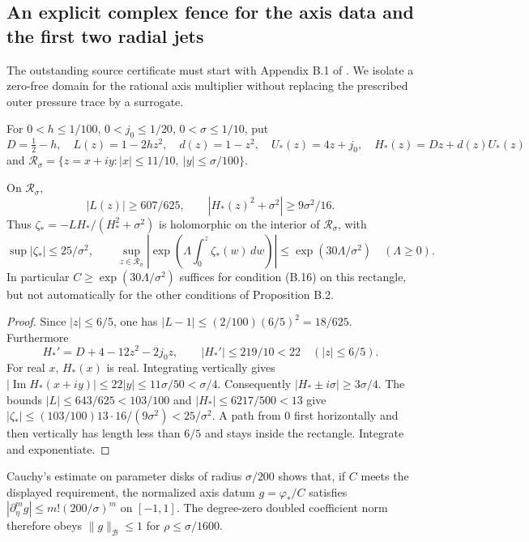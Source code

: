 \subsection*{An explicit complex fence for the axis data and the first two radial jets}
\label{subsec:axis-fence-jets}
The outstanding source certificate must start with Appendix B.1 of \cite{openai2026}. We isolate a zero-free domain for the rational axis multiplier without replacing the prescribed outer pressure trace by a surrogate.

For $0<h\le1/100$, $0<j_0\le1/20$, $0<\sigma\le1/10$, put
\[
 D=\tfrac12-h,\quad L(z)=1-2hz^2,\quad d(z)=1-z^2,\quad
 U_*(z)=4z+j_0,\quad H_*(z)=Dz+d(z)U_*(z)
\]
and $\mathcal R_\sigma=\{z=x+iy:|x|\le11/10,\ |y|\le\sigma/100\}$.

\begin{proposition}
\label{prop:axis-data-zero-free}
On $\mathcal R_\sigma$,
\[
 |L(z)|\ge607/625,\qquad |H_*(z)^2+\sigma^2|\ge9\sigma^2/16.
\]
Thus $\zeta_*=-LH_*/(H_*^2+\sigma^2)$ is holomorphic on the interior of $\mathcal R_\sigma$, with
\[
 \sup|\zeta_*|\le25/\sigma^2,\qquad
 \sup_{z\in\mathcal R_\sigma}\left|\exp\left(\Lambda\int_0^z\zeta_*(w)\,dw\right)\right|
 \le\exp(30\Lambda/\sigma^2)
 \quad(\Lambda\ge0).
\]
In particular $C\ge\exp(30\Lambda/\sigma^2)$ suffices for condition (B.16) on this rectangle, but not automatically for the other conditions of Proposition B.2.
\end{proposition}
\begin{proof}
Since $|z|\le6/5$, one has
$|L-1|\le(2/100)(6/5)^2=18/625$. Furthermore
\[
 H_*'=D+4-12z^2-2j_0z,\qquad
 |H_*'|\le219/10<22\quad (|z|\le6/5).
\]
For real $x$, $H_*(x)$ is real. Integrating vertically gives
$|\operatorname{Im}H_*(x+iy)|\le22|y|\le11\sigma/50<\sigma/4$.
Consequently $|H_*\pm i\sigma|\ge3\sigma/4$. The bounds
$|L|\le643/625<103/100$ and $|H_*|\le6217/500<13$
give $|\zeta_*|\le(103/100)13\cdot16/(9\sigma^2)<25/\sigma^2$.
A path from $0$ first horizontally and then vertically has length
less than $6/5$ and stays inside the rectangle. Integrate and exponentiate.
\end{proof}

Cauchy's estimate on parameter disks of radius $\sigma/200$ shows that, if $C$ meets the displayed requirement, the normalized axis datum $g=\varphi_*/C$ satisfies
$|\partial_\eta^m g|\le m!(200/\sigma)^m$ on $[-1,1]$.
The degree-zero doubled coefficient norm therefore obeys
$\|g\|_{\mathcal B}\le1$ for $\rho\le\sigma/1600$.

